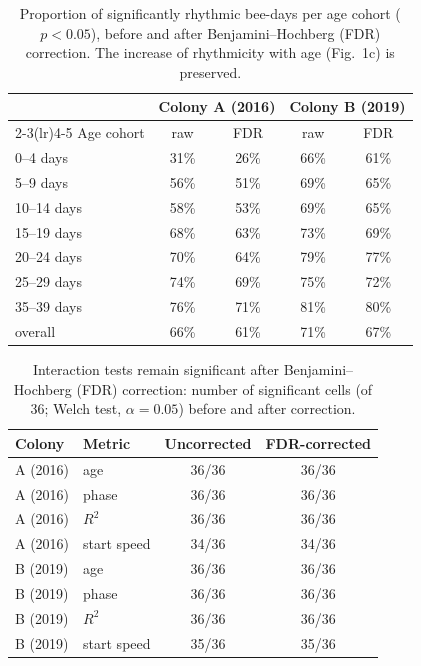 \documentclass{article}
\newcommand{\added}[1]{{\color{blue}#1}}
\newcommand{\added}[1]{#1}
\begin{document}
\begin{table}[ht]
\centering
\caption{\added{Proportion of significantly rhythmic bee-days per age cohort ($p<0.05$), before and after
Benjamini--Hochberg (FDR) correction. The increase of rhythmicity with age (Fig.~1c) is preserved.}}
\label{tab:fig1c_fdr}
\begin{tabular}{lcccc}
\toprule
& \multicolumn{2}{c}{Colony A (2016)} & \multicolumn{2}{c}{Colony B (2019)} \\
\cmidrule(lr){2-3}\cmidrule(lr){4-5}
Age cohort & raw & FDR & raw & FDR \\
\midrule
0--4 days     & 31\% & 26\% & 66\% & 61\% \\
5--9 days     & 56\% & 51\% & 69\% & 65\% \\
10--14 days   & 58\% & 53\% & 69\% & 65\% \\
15--19 days   & 68\% & 63\% & 73\% & 69\% \\
20--24 days   & 70\% & 64\% & 79\% & 77\% \\
25--29 days   & 74\% & 69\% & 75\% & 72\% \\
35--39 days   & 76\% & 71\% & 81\% & 80\% \\
\midrule
overall       & 66\% & 61\% & 71\% & 67\% \\
\bottomrule
\end{tabular}
\end{table}

\begin{table}[ht]\centering
\caption{\added{Interaction tests remain significant after Benjamini--Hochberg (FDR) correction: number
of significant cells (of 36; Welch test, $\alpha=0.05$) before and after correction.}}
\label{tab:fdr_interaction}
\begin{tabular}{llcc}
\toprule
Colony & Metric & Uncorrected & FDR-corrected \\ \midrule
A (2016) & age         & 36/36 & 36/36 \\
A (2016) & phase       & 36/36 & 36/36 \\
A (2016) & $R^2$       & 36/36 & 36/36 \\
A (2016) & start speed & 34/36 & 34/36 \\
B (2019) & age         & 36/36 & 36/36 \\
B (2019) & phase       & 36/36 & 36/36 \\
B (2019) & $R^2$       & 36/36 & 36/36 \\
B (2019) & start speed & 35/36 & 35/36 \\
\bottomrule
\end{tabular}
\end{table}
\end{document}
